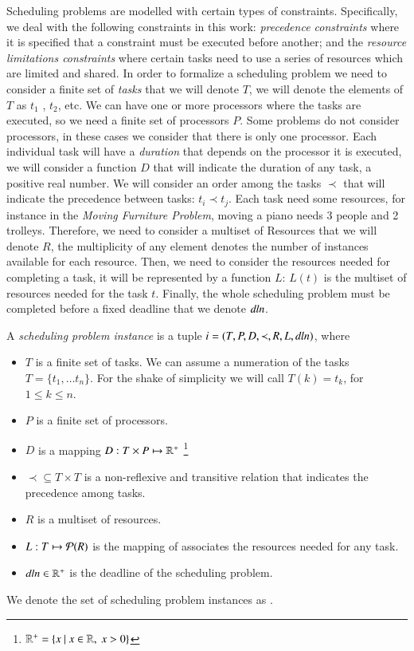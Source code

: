 Scheduling problems are modelled with certain types of constraints.
Specifically, we deal with the following constraints in this work:
\textit{precedence constraints} where it is specified that a constraint
must be executed before another; and the \textit{resource
  limitations constraints} where certain tasks need to use a series of
resources which are limited and shared. In order to formalize a
scheduling problem we need to consider a finite set of \emph{tasks} that we will
denote $T$, we will denote the elements of $T$ as $t_{1}$ , $t_{2}$,
etc.
We can have one or more processors where the tasks are executed, so we
need a finite set of processors $P$. Some problems do not consider
processors, in these cases we consider that there is only one processor.
Each individual task will have a \emph{duration} that depends on the
processor it is executed, we will
consider a function $D$ that will indicate the duration of any task, a
positive real number.
We will consider an order among the tasks $\prec$ that
will indicate the precedence between tasks: $t_{i}\prec t_{j}$.
Each task need some resources, for instance in the \emph{Moving
  Furniture Problem}, moving a piano needs
3 people and 2 trolleys. Therefore, we need to consider a multiset of
Resources that we will denote $R$,
the multiplicity of any element denotes the number of
instances available for each resource. Then, we need to consider the
resources needed for completing a task, it will be represented by a
function $L$: $L(t)$ is the multiset of resources needed for the task
$t$. Finally, the whole scheduling problem must be completed before a
fixed deadline that we denote $\mathit{dln}$.

\begin{definition}
  A \emph{scheduling problem instance} is a tuple $i=(T, P, D, \prec, R, L, \mathit{dln})$, where
  \begin{itemize}
  \item $T$ is a finite set of tasks. We can assume a numeration of
    the tasks $T=\{t_{1},\ldots t_{n}\}$. For the shake of simplicity
    we will call $T(k)=t_{k}$, for $1\leq k\leq n$.
  \item $P$ is a finite set of processors.
  \item $D$ is a mapping $D:T\times P\mapsto \mathbb{R}^{+}$
    \footnote{$\real^{+}=\{x\ |\ x\in\real,\ x>0\}$}
  \item $\prec\subseteq T\times T$ is a non-reflexive and transitive relation that
    indicates the precedence among tasks.
  \item $R$ is a multiset of resources.
  \item $L: T\mapsto{\cal P}(R)$ is the mapping of associates the
    resources needed for any task.
  \item $\mathit{dln}\in\mathbb{R}^{+}$ is the deadline of the scheduling problem.
  \end{itemize}
  We denote the set of scheduling problem instances as \SPI.
\end{definition}


